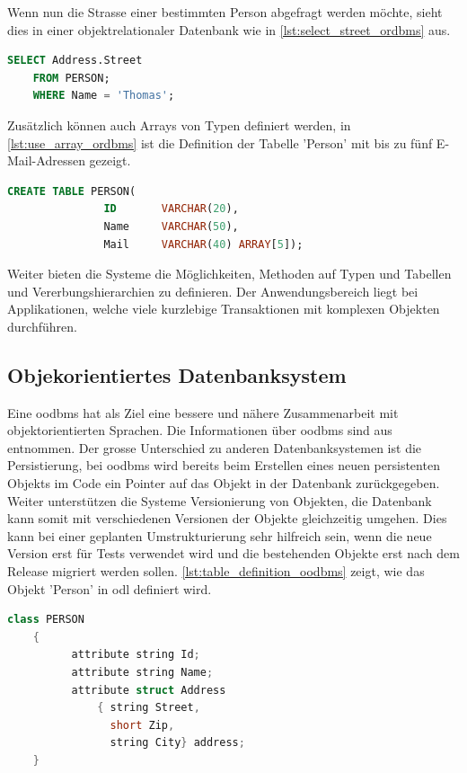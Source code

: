 Wenn nun die Strasse einer bestimmten Person abgefragt werden möchte, sieht dies in einer objektrelationaler Datenbank wie in \autoref{lst:select_street_ordbms} aus.

\begin{lstlisting}[language=SQL, caption=Abfrage in objektrelationalem Datenbanksystem, label=lst:select_street_ordbms]  
    SELECT Address.Street
    FROM PERSON;
    WHERE Name = 'Thomas';
\end{lstlisting}

Zusätzlich können auch Arrays von Typen definiert werden, in \autoref{lst:use_array_ordbms} ist die Definition der Tabelle 'Person' mit 
bis zu fünf E-Mail-Adressen gezeigt.

\begin{lstlisting}[language=SQL, caption=Verwendung von Array in objektrelationalem Datenbanksystem, label=lst:use_array_ordbms]  
    CREATE TABLE PERSON(
               ID       VARCHAR(20),
               Name     VARCHAR(50),
               Mail     VARCHAR(40) ARRAY[5]);
\end{lstlisting}

Weiter bieten die Systeme die Möglichkeiten, Methoden auf Typen und Tabellen und Vererbungshierarchien zu definieren. Der Anwendungsbereich 
liegt bei Applikationen, welche viele kurzlebige Transaktionen mit komplexen Objekten durchführen.

\subsection{Objekorientiertes Datenbanksystem}\label{object_db}
Eine \gls{oodbms} hat als Ziel eine bessere und nähere Zusammenarbeit mit objektorientierten Sprachen. 
Die Informationen über \gls{oodbms} sind aus \cite{limited2010introduction} entnommen. Der grosse Unterschied zu anderen Datenbanksystemen
ist die Persistierung, bei \gls{oodbms} wird bereits beim Erstellen eines neuen persistenten Objekts im Code ein Pointer auf das Objekt in der Datenbank zurückgegeben. 
Weiter unterstützen die Systeme Versionierung von Objekten, die Datenbank kann somit mit verschiedenen Versionen der Objekte gleichzeitig umgehen. 
Dies kann bei einer geplanten Umstrukturierung sehr hilfreich sein, wenn die neue Version erst für Tests verwendet wird und die bestehenden Objekte erst nach dem 
Release migriert werden sollen. \autoref{lst:table_definition_oodbms} zeigt, wie das Objekt 'Person' in \gls{odl} definiert wird.

\begin{lstlisting}[language=C++, caption=Objektdefinition in objektorientierem Datenbanksystem, label=lst:table_definition_oodbms]  
    class PERSON
    {
          attribute string Id;
          attribute string Name;
          attribute struct Address
              { string Street,
                short Zip,
                string City} address;
    }
\end{lstlisting}

